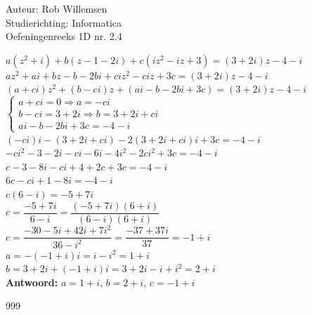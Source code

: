 \documentclass[a4paper]{article}
\begin{document}
\noindent \large Auteur: Rob Willemsen \\
\noindent \large Studierichting: Informatica\\
\noindent \large Oefeningenreeks 1D nr. 2.4\\

\medskip

\normalsize

$a(z^2 + i) + b(z - 1 - 2i) + c(iz^2 - iz + 3) = (3+2i)z - 4 - i$ \\

$az^2 + ai + bz - b - 2bi + ciz^2 - ciz + 3c = (3+2i)z - 4 - i$ \\

$(a+ci)z^2 + (b-ci)z + (ai - b - 2bi + 3c) = (3+2i)z - 4 - i$ \\

$\left \{
    \begin{array}{l}
        a + ci = 0 \Rightarrow a = -ci \\
        b - ci = 3 + 2i \Rightarrow b = 3 + 2i + ci \\
        ai - b - 2bi + 3c = -4 - i
    \end{array}
\right .$ \\

$(-ci)i - (3 + 2i + ci) - 2(3 + 2i + ci)i + 3c = -4 - i$ \\

$-ci^2 - 3 - 2i - ci - 6i - 4i^2 - 2ci^2 + 3c = -4 - i$ \\

$c - 3 - 8i - ci + 4 + 2c + 3c = -4 - i$ \\

$6c - ci + 1 - 8i = -4 - i$ \\

$c(6 - i) = -5 + 7i$ \\

$c = \dfrac{-5 + 7i}{6 - i} = \dfrac{(-5 + 7i)(6 + i)}{(6 - i)(6 + i)}$ \\

$c = \dfrac{-30 - 5i + 42i + 7i^2}{36 - i^2} = \dfrac{-37 + 37i}{37} = -1 + i$ \\

$a = -(-1 + i)i = i - i^2 = 1 + i$ \\

$b = 3 + 2i + (-1 + i)i = 3 + 2i - i + i^2 = 2 + i$ \\

\textbf{Antwoord:} $a = 1+i$, $b = 2+i$, $c = -1+i$ \\

\begin{thebibliography}{999}
\end{thebibliography}
\end{document}
